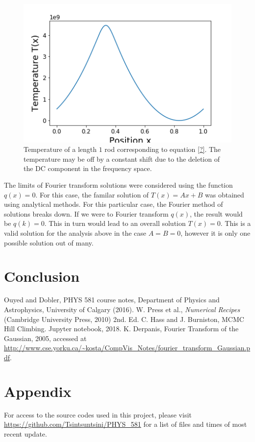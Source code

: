 \documentclass[twocolumn]{article}
\begin{document}
\begin{figure}
\centering
\includegraphics[width=\linewidth]{temp}
\caption{Temperature of a length $1$ rod corresponding to equation \ref{?}. The temperature may be off by a constant shift due to the deletion of the DC component in the frequency space.}
\label{fig:temp}
\end{figure}

The limits of Fourier transform solutions were considered using the function $q(x) = 0$. For this case, the familar solution of $T(x) = Ax + B$ was obtained using analytical methods. For this particular case, the Fourier method of solutions breaks down. If we were to Fourier transform $q(x)$, the result would be $q(k)=0$. This in turn would lead to an overall solution $T(x) = 0$. This is a valid solution for the analysis above in the case $A=B=0$, however it is only one possible solution out of many.


\section{Conclusion}



\begin{thebibliography}{00}
	Ouyed and Dobler, PHYS 581 course notes, Department of Physics and Astrophysics, University of Calgary (2016).
	W. Press et al., \emph{Numerical Recipes} (Cambridge University Press, 2010) 2nd. Ed.
	C. Hass and J. Burniston, MCMC Hill Climbing. Jupyter notebook, 2018.
	K. Derpanis, Fourier Transform of the Gaussian, 2005, accessed at \url{http://www.cse.yorku.ca/~kosta/CompVis_Notes/fourier_transform_Gaussian.pdf}.
\end{thebibliography}

\section{Appendix}
For access to the source codes used in this project, please visit \url{https://github.com/Tsintsuntsini/PHYS_581} for a list of files and times of most recent update.
	
\end{document}
